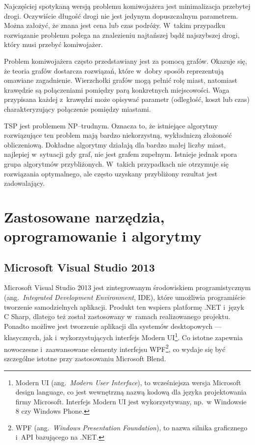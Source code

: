 \documentclass[12pt,a4paper]{report}
\begin{document}
Najczęściej spotykaną wersją problemu komiwojażera jest minimalizacja przebytej drogi. Oczywiście długość drogi nie jest jedynym dopuszczalnym parametrem. Można założyć, że znana jest cena lub czas podróży. W~takim przypadku rozwiązanie problemu polega na znalezieniu najtańszej bądź najszybszej drogi, który musi przebyć komiwojażer.

Problem komiwojażera często przedstawiany jest za pomocą grafów. Okazuje się, że teoria grafów dostarcza rozwiązań, które w~dobry sposób reprezentują omawiane zagadnienie. Wierzchołki grafów mogą pełnić rolę miast, natomiast krawędzie są połączeniami pomiędzy parą konkretnych miejscowości. Waga przypisana każdej z~krawędzi może opisywać parametr (odległość, koszt lub czas) charakteryzujący połączenie pomiędzy miastami. 

TSP jest problemem NP--trudnym. Oznacza to, że istniejące algorytmy rozwiązujące ten problem mają bardzo niekorzystną, wykładniczą złożoność obliczeniową. Dokładne algorytmy działają dla bardzo małej liczby miast, najlepiej w~sytuacji gdy graf, nie jest grafem zupełnym. Istnieje jednak spora grupa algorytmów przybliżonych. W~takich przypadkach nie otrzymuje się rozwiązania optymalnego, ale często uzyskany przybliżony rezultat jest zadowalający. 

\chapter{Zastosowane narzędzia, oprogramowanie i algorytmy}

\section{Microsoft Visual Studio 2013}
Microsoft Visual Studio 2013 jest zintegrowanym środowiskiem programistycznym (ang.~\textit{Integrated Development Environment}, IDE), które
umożliwia programiście tworzenie samodzielnych aplikacji. Produkt ten wspiera platformę .NET i~język C Sharp, dlatego też został zastosowany w~ramach realizowanego projektu. Ponadto możliwe jest tworzenie aplikacji dla systemów desktopowych --- klasycznych, jak i~wykorzystujących interfejs Modern UI\footnote{Modern UI (ang.~\textit{Modern User Interface}), to wcześniejsza wersja Microsoft design language, co jest wewnętrzną nazwą kodową dla języka projektowania firmy Microsoft. Interfejs Modern UI jest wykorzystywany, np.~w Windowsie 8 czy Windows Phone.}. Co istotne zapewnia nowoczesne i~zaawansowane elementy interfejsu WPF\footnote{WPF (ang.~\textit{Windows Presentation Foundation}), to nazwa silnika graficznego i~API bazującego na .NET.}, co wydaje się być szczególne istotne przy zastosowaniu Microsoft Blend.
\end{document}
